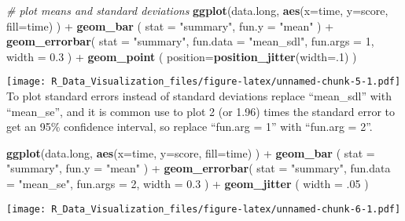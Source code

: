 \documentclass[]{article}
\newenvironment{Shaded}{\begin{snugshade}}{\end{snugshade}}
\newcommand{\KeywordTok}[1]{\textcolor[rgb]{0.13,0.29,0.53}{\textbf{{#1}}}}
\newcommand{\DataTypeTok}[1]{\textcolor[rgb]{0.13,0.29,0.53}{{#1}}}
\newcommand{\DecValTok}[1]{\textcolor[rgb]{0.00,0.00,0.81}{{#1}}}
\newcommand{\FloatTok}[1]{\textcolor[rgb]{0.00,0.00,0.81}{{#1}}}
\newcommand{\StringTok}[1]{\textcolor[rgb]{0.31,0.60,0.02}{{#1}}}
\newcommand{\CommentTok}[1]{\textcolor[rgb]{0.56,0.35,0.01}{\textit{{#1}}}}
\newcommand{\NormalTok}[1]{{#1}}
\begin{document}
\begin{Shaded}
\begin{Highlighting}[]
\CommentTok{# plot means and standard deviations}
\KeywordTok{ggplot}\NormalTok{(data.long, }\KeywordTok{aes}\NormalTok{(}\DataTypeTok{x=}\NormalTok{time, }\DataTypeTok{y=}\NormalTok{score, }\DataTypeTok{fill=}\NormalTok{time) ) +}\StringTok{ }
\StringTok{  }\KeywordTok{geom_bar}     \NormalTok{( }\DataTypeTok{stat =} \StringTok{"summary"}\NormalTok{, }\DataTypeTok{fun.y    =} \StringTok{"mean"} \NormalTok{) +}\StringTok{ }
\StringTok{  }\KeywordTok{geom_errorbar}\NormalTok{( }\DataTypeTok{stat =} \StringTok{"summary"}\NormalTok{, }\DataTypeTok{fun.data =} \StringTok{"mean_sdl"}\NormalTok{, }\DataTypeTok{fun.args =} \DecValTok{1}\NormalTok{, }\DataTypeTok{width =} \FloatTok{0.3} \NormalTok{) +}\StringTok{ }
\StringTok{  }\KeywordTok{geom_point}   \NormalTok{( }\DataTypeTok{position=}\KeywordTok{position_jitter}\NormalTok{(}\DataTypeTok{width=}\NormalTok{.}\DecValTok{1}\NormalTok{) )}
\end{Highlighting}
\end{Shaded}

\texttt{[image: R\_Data\_Visualization\_files/figure-latex/unnamed-chunk-5-1.pdf]}
To plot standard errors instead of standard deviations replace
``mean\_sdl'' with ``mean\_se'', and it is common use to plot 2 (or
1.96) times the standard error to get an 95\% confidence interval, so
replace ``fun.arg = 1'' with ``fun.arg = 2''.

\begin{Shaded}
\begin{Highlighting}[]
\KeywordTok{ggplot}\NormalTok{(data.long, }\KeywordTok{aes}\NormalTok{(}\DataTypeTok{x=}\NormalTok{time, }\DataTypeTok{y=}\NormalTok{score, }\DataTypeTok{fill=}\NormalTok{time) ) +}\StringTok{ }
\StringTok{  }\KeywordTok{geom_bar}     \NormalTok{( }\DataTypeTok{stat =} \StringTok{"summary"}\NormalTok{, }\DataTypeTok{fun.y    =} \StringTok{"mean"} \NormalTok{) +}\StringTok{ }
\StringTok{  }\KeywordTok{geom_errorbar}\NormalTok{( }\DataTypeTok{stat =} \StringTok{"summary"}\NormalTok{, }\DataTypeTok{fun.data =} \StringTok{"mean_se"}\NormalTok{, }\DataTypeTok{fun.args =} \DecValTok{2}\NormalTok{, }\DataTypeTok{width =} \FloatTok{0.3} \NormalTok{) +}\StringTok{ }
\StringTok{  }\KeywordTok{geom_jitter}  \NormalTok{( }\DataTypeTok{width =} \NormalTok{.}\DecValTok{05} \NormalTok{)}
\end{Highlighting}
\end{Shaded}

\texttt{[image: R\_Data\_Visualization\_files/figure-latex/unnamed-chunk-6-1.pdf]}
\end{document}

